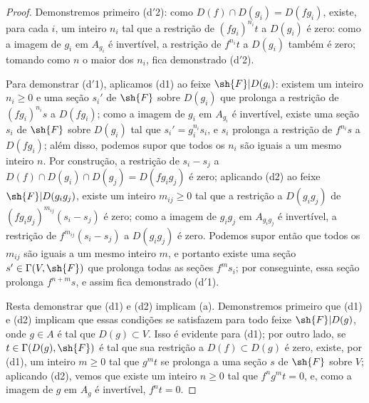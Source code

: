 \documentclass[oneside]{amsart}
\renewcommand{\geq}{\geqslant}
\newcommand{\oldpage}[2][]{{\marginnote{\normalfont\textbf{#1}~|~#2}}\ignorespaces}
\begin{document}
\begin{proof}
Demonstremos primeiro (d$'$2): como $D(f)\cap D(g_i)=D(fg_i)$, existe, para cada $i$, um inteiro $n_i$ tal que a restrição de $(fg_i)^{n_i}t$ a $D(g_i)$ é zero:
como a imagem de $g_i$ em $A_{g_i}$ é invertível, a restrição de $f^{n_i}t$ a $D(g_i)$ também é zero;
tomando como $n$ o maior dos $n_i$, fica demonstrado (d$'$2).

Para demonstrar (d$'$1), aplicamos (d1) ao feixe $\sh{F}|D(g_i)$: existem um inteiro $n_i\geq 0$ e uma seção $s_i'$ de $\sh{F}$ sobre $D(g_i)$ que prolonga a restrição de $(fg_i)^{n_i}s$ a $D(fg_i)$;
como a imagem de $g_i$ em $A_{g_i}$ é invertível, existe uma seção $s_i$ de $\sh{F}$ sobre $D(g_i)$ tal que $s_i'=g_i^{n_i}s_i$, e $s_i$ prolonga a restrição de $f^{n_i}s$ a $D(fg_i)$;
além disso, podemos supor que todos os $n_i$ são iguais a um mesmo inteiro $n$.
Por construção, a restrição de $s_i-s_j$ a $D(f)\cap D(g_i)\cap D(g_j)=D(fg_i g_j)$ é zero;
aplicando (d2) ao feixe $\sh{F}|D(g_i g_j)$, existe um inteiro $m_{ij}\geq 0$ tal que a restrição a $D(g_i g_j)$ de $(fg_i g_j)^{m_{ij}}(s_i-s_j)$ é zero;
como a imagem de $g_i g_j$ em $A_{g_i g_j}$ é invertível, a restrição de $f^{m_{ij}}(s_i-s_j)$ a $D(g_i g_j)$ é zero.
Podemos supor então que todos os $m_{ij}$ são iguais a um mesmo inteiro $m$, e portanto existe uma seção $s'\in\Gamma(V,\sh{F})$ que prolonga todas as seções $f^m s_i$;
por conseguinte, essa seção prolonga $f^{n+m}s$, e assim fica demonstrado (d$'$1).

Resta demonstrar que (d1) e (d2) implicam (a).
Demonstremos primeiro que (d1) e (d2) implicam que essas condições se satisfazem para todo feixe $\sh{F}|D(g)$, onde $g\in A$ é tal que $D(g)\subset V$.
Isso é evidente para (d1);
por outro lado, se $t\in\Gamma(D(g),\sh{F})$ é tal que sua restrição a $D(f)\subset D(g)$ é zero, existe, por (d1), um inteiro $m\geq 0$ tal que $g^m t$
\oldpage[I]{92}
se prolonga a uma seção $s$ de $\sh{F}$ sobre $V$;
aplicando (d2), vemos que existe um inteiro $n\geq 0$ tal que $f^n g^m t=0$, e, como a imagem de $g$ em $A_g$ é invertível, $f^n t=0$.


\end{proof}
\end{document}
